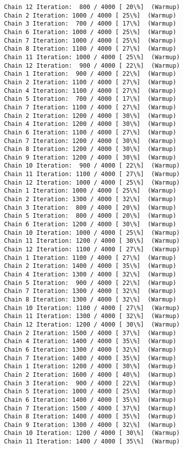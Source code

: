 \documentclass[11pt]{article}
\begin{document}
\begin{Verbatim}[commandchars=\\\{\}]
Chain 12 Iteration:  800 / 4000 [ 20\%]  (Warmup)
Chain 2 Iteration: 1000 / 4000 [ 25\%]  (Warmup)
Chain 3 Iteration:  700 / 4000 [ 17\%]  (Warmup)
Chain 6 Iteration: 1000 / 4000 [ 25\%]  (Warmup)
Chain 7 Iteration: 1000 / 4000 [ 25\%]  (Warmup)
Chain 8 Iteration: 1100 / 4000 [ 27\%]  (Warmup)
Chain 11 Iteration: 1000 / 4000 [ 25\%]  (Warmup)
Chain 12 Iteration:  900 / 4000 [ 22\%]  (Warmup)
Chain 1 Iteration:  900 / 4000 [ 22\%]  (Warmup)
Chain 2 Iteration: 1100 / 4000 [ 27\%]  (Warmup)
Chain 4 Iteration: 1100 / 4000 [ 27\%]  (Warmup)
Chain 5 Iteration:  700 / 4000 [ 17\%]  (Warmup)
Chain 7 Iteration: 1100 / 4000 [ 27\%]  (Warmup)
Chain 2 Iteration: 1200 / 4000 [ 30\%]  (Warmup)
Chain 4 Iteration: 1200 / 4000 [ 30\%]  (Warmup)
Chain 6 Iteration: 1100 / 4000 [ 27\%]  (Warmup)
Chain 7 Iteration: 1200 / 4000 [ 30\%]  (Warmup)
Chain 8 Iteration: 1200 / 4000 [ 30\%]  (Warmup)
Chain 9 Iteration: 1200 / 4000 [ 30\%]  (Warmup)
Chain 10 Iteration:  900 / 4000 [ 22\%]  (Warmup)
Chain 11 Iteration: 1100 / 4000 [ 27\%]  (Warmup)
Chain 12 Iteration: 1000 / 4000 [ 25\%]  (Warmup)
Chain 1 Iteration: 1000 / 4000 [ 25\%]  (Warmup)
Chain 2 Iteration: 1300 / 4000 [ 32\%]  (Warmup)
Chain 3 Iteration:  800 / 4000 [ 20\%]  (Warmup)
Chain 5 Iteration:  800 / 4000 [ 20\%]  (Warmup)
Chain 6 Iteration: 1200 / 4000 [ 30\%]  (Warmup)
Chain 10 Iteration: 1000 / 4000 [ 25\%]  (Warmup)
Chain 11 Iteration: 1200 / 4000 [ 30\%]  (Warmup)
Chain 12 Iteration: 1100 / 4000 [ 27\%]  (Warmup)
Chain 1 Iteration: 1100 / 4000 [ 27\%]  (Warmup)
Chain 2 Iteration: 1400 / 4000 [ 35\%]  (Warmup)
Chain 4 Iteration: 1300 / 4000 [ 32\%]  (Warmup)
Chain 5 Iteration:  900 / 4000 [ 22\%]  (Warmup)
Chain 7 Iteration: 1300 / 4000 [ 32\%]  (Warmup)
Chain 8 Iteration: 1300 / 4000 [ 32\%]  (Warmup)
Chain 10 Iteration: 1100 / 4000 [ 27\%]  (Warmup)
Chain 11 Iteration: 1300 / 4000 [ 32\%]  (Warmup)
Chain 12 Iteration: 1200 / 4000 [ 30\%]  (Warmup)
Chain 2 Iteration: 1500 / 4000 [ 37\%]  (Warmup)
Chain 4 Iteration: 1400 / 4000 [ 35\%]  (Warmup)
Chain 6 Iteration: 1300 / 4000 [ 32\%]  (Warmup)
Chain 7 Iteration: 1400 / 4000 [ 35\%]  (Warmup)
Chain 1 Iteration: 1200 / 4000 [ 30\%]  (Warmup)
Chain 2 Iteration: 1600 / 4000 [ 40\%]  (Warmup)
Chain 3 Iteration:  900 / 4000 [ 22\%]  (Warmup)
Chain 5 Iteration: 1000 / 4000 [ 25\%]  (Warmup)
Chain 6 Iteration: 1400 / 4000 [ 35\%]  (Warmup)
Chain 7 Iteration: 1500 / 4000 [ 37\%]  (Warmup)
Chain 8 Iteration: 1400 / 4000 [ 35\%]  (Warmup)
Chain 9 Iteration: 1300 / 4000 [ 32\%]  (Warmup)
Chain 10 Iteration: 1200 / 4000 [ 30\%]  (Warmup)
Chain 11 Iteration: 1400 / 4000 [ 35\%]  (Warmup)

\end{Verbatim}
\end{document}
